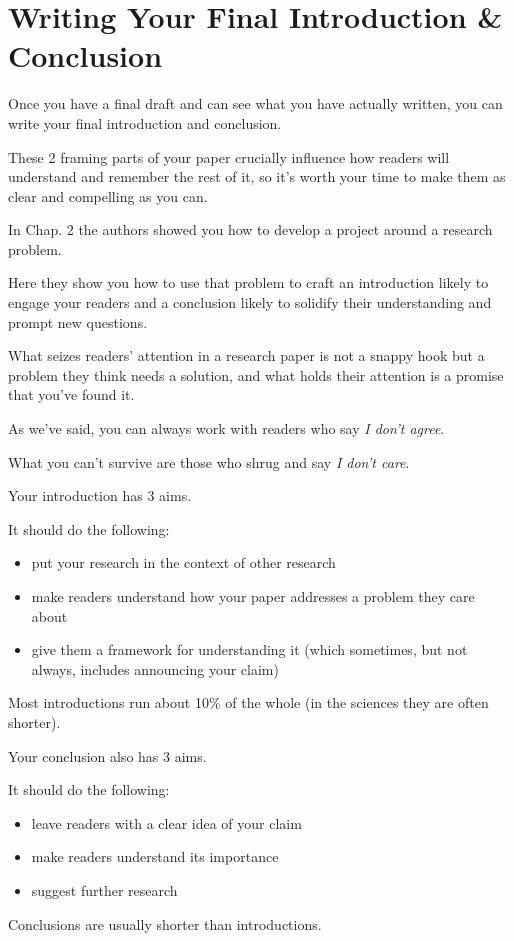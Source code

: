 \documentclass[oneside]{book}
\numberwithin{equation}{section}
\begin{document}

\chapter{Writing Your Final Introduction \& Conclusion}

Once you have a final draft and can see what you have actually written, you can write your final introduction and conclusion.

These 2 framing parts of your paper crucially influence how readers will understand and remember the rest of it, so it's worth your time to make them as clear and compelling as you can.

In Chap. 2 the authors showed you how to develop a project around a research problem.

Here they show you how to use that problem to craft an introduction likely to engage your readers and a conclusion likely to solidify their understanding and prompt new questions.

%
What seizes readers' attention in a research paper is not a snappy hook but a problem they think needs a solution, and what holds their attention is a promise that you've found it.

As we've said, you can always work with readers who say \textit{I don't agree}.

What you can't survive are those who shrug and say \textit{I don't care}.

%
Your introduction has 3 aims.

It should do the following:
\begin{itemize}
    \item put your research in the context of other research
    \item make readers understand how your paper addresses a problem they care about
    \item give them a framework for understanding it (which sometimes, but not always, includes announcing your claim)
\end{itemize}
Most introductions run about 10\% of the whole (in the sciences they are often shorter).

%
Your conclusion also has 3 aims.

It should do the following:
\begin{itemize}
    \item leave readers with a clear idea of your claim
    \item make readers understand its importance
    \item suggest further research
\end{itemize}
Conclusions are usually shorter than introductions.
\end{document}
